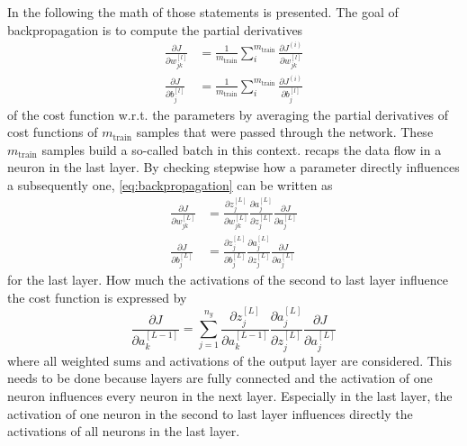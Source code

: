 In the following the math of those statements is presented.
The goal of backpropagation is to compute the partial derivatives
\begin{subequations}
	\label{eq:backpropagation}
	\begin{align}
		\frac{\partial J}{\partial w^{[l]}_{jk}} &= \frac{1}{m_{\text{train}}} \sum_{i}^{m_{\text{train}}} \frac{\partial J^{(i)}}{\partial w^{[l]}_{jk}} \\
		\frac{\partial J}{\partial b^{[l]}_j} &= \frac{1}{m_{\text{train}}} \sum_{i}^{m_{\text{train}}} \frac{\partial J^{(i)}}{\partial b^{[l]}_j}
	\end{align}
\end{subequations}
of the cost function w.r.t. the parameters by averaging the partial derivatives of cost functions of $m_{\text{train}}$ samples that were passed through the network.
These $m_{\text{train}}$ samples build a so-called batch in this context.
 recaps the data flow in a neuron in the last layer.
By checking stepwise how a parameter directly influences a subsequently one, \eqref{eq:backpropagation} can be written as
\begin{subequations}
	\label{eq:backpropagation-last}
	\begin{align}
		\frac{\partial J}{\partial w^{[L]}_{jk}} &= \frac{\partial z^{[L]}_j}{\partial w^{[L]}_{jk}} \frac{\partial a^{[L]}_{j}}{\partial z^{[L]}_{j}} \frac{\partial J}{\partial a^{[L]}_{j}} \\
		\frac{\partial J}{\partial b^{[L]}_{j}} &= \frac{\partial z^{[L]}_j}{\partial b^{[L]}_{j}} \frac{\partial a^{[L]}_{j}}{\partial z^{[L]}_{j}} \frac{\partial J}{\partial a^{[L]}_{j}}
	\end{align}
\end{subequations}
for the last layer.
How much the activations of the second to last layer influence the cost function is expressed by
\begin{equation}
	\label{eq:backpropagation-activations-last}
	\frac{\partial J}{\partial a^{[L-1]}_{k}} = \sum_{j=1}^{n_y} \frac{\partial z^{[L]}_j}{\partial a^{[L-1]}_{k}} \frac{\partial a^{[L]}_{j}}{\partial z^{[L]}_{j}} \frac{\partial J}{\partial a^{[L]}_{j}}
\end{equation}
where all weighted sums and activations of the output layer are considered.
This needs to be done because layers are fully connected and the activation of one neuron influences every neuron in the next layer.
Especially in the last layer, the activation of one neuron in the second to last layer influences directly the activations of all neurons in the last layer.
